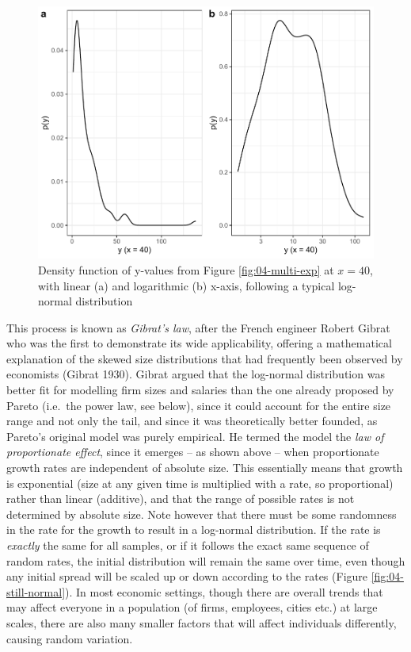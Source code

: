 \documentclass[
  12pt,
]{book}
\begin{document}
\begin{figure}

{\centering \includegraphics[width=0.7\linewidth]{bookdown-demo_files/figure-latex/04-lnorm-exp-1} 

}

\caption{Density function of y-values from Figure \ref{fig:04-multi-exp} at \(x = 40\), with linear (a) and logarithmic (b) x-axis, following a typical log-normal distribution}\label{fig:04-lnorm-exp}
\end{figure}

This process is known as \emph{Gibrat's law}, after the French engineer Robert Gibrat who was the first to demonstrate its wide applicability, offering a mathematical explanation of the skewed size distributions that had frequently been observed by economists (Gibrat 1930). Gibrat argued that the log-normal distribution was better fit for modelling firm sizes and salaries than the one already proposed by Pareto (i.e.~the power law, see below), since it could account for the entire size range and not only the tail, and since it was theoretically better founded, as Pareto's original model was purely empirical. He termed the model the \emph{law of proportionate effect}, since it emerges -- as shown above -- when proportionate growth rates are independent of absolute size. This essentially means that growth is exponential (size at any given time is multiplied with a rate, so proportional) rather than linear (additive), and that the range of possible rates is not determined by absolute size. Note however that there must be some randomness in the rate for the growth to result in a log-normal distribution. If the rate is \emph{exactly} the same for all samples, or if it follows the exact same sequence of random rates, the initial distribution will remain the same over time, even though any initial spread will be scaled up or down according to the rates (Figure \ref{fig:04-still-normal}). In most economic settings, though there are overall trends that may affect everyone in a population (of firms, employees, cities etc.) at large scales, there are also many smaller factors that will affect individuals differently, causing random variation.
\end{document}

